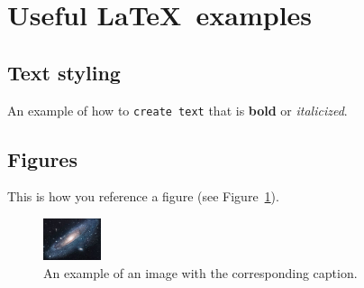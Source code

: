 \documentclass{article}
\begin{document}


\appendix

\section{Useful \LaTeX ~examples} 
 
\subsection{Text styling}
An example of how to \texttt{create text} that is \textbf{bold} or \textit{italicized}. 

\subsection{Figures}
This is how you reference a figure (see Figure~\ref{fig:universe-pic}).

\begin{figure}[h]
\centering
\includegraphics[width=0.15\textwidth, width=0.35\textwidth]{universe.jpg}
\caption{An example of an image with the corresponding caption.}
\label{fig:universe-pic} %
\small
\end{figure}
\end{document}
